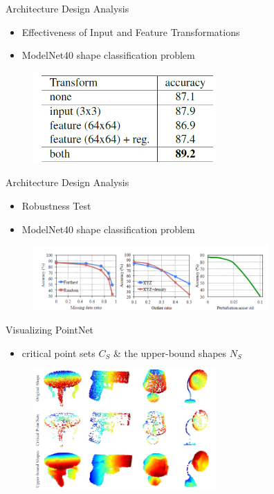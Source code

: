\documentclass[serif,mathserif]{beamer}
\begin{document}
\begin{frame}{Architecture Design Analysis}
	\begin{itemize}
		\item Effectiveness of Input and Feature Transformations
		\item ModelNet40 shape classification problem
	\end{itemize}
	\begin{figure}
		\includegraphics[width=7cm]{image/arch2.png}
	\end{figure}
\end{frame}

\begin{frame}{Architecture Design Analysis}
	\begin{itemize}
		\item Robustness Test
		\item ModelNet40 shape classification problem
	\end{itemize}
	\begin{figure}
		\includegraphics[width=9cm]{image/arch3.png}
	\end{figure}
\end{frame}

\begin{frame}{Visualizing PointNet}
	\begin{itemize}
		\item critical point sets $ C_S $ \& the upper-bound shapes $ N_S $
	\end{itemize}
	
	\begin{figure}
		\includegraphics[width=7cm]{image/visual.png}
	\end{figure}
\end{frame}
\end{document}
